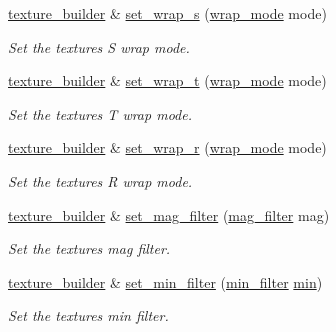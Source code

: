 \begin{DoxyCompactItemize}
\mbox{\hyperlink{classmoka_1_1texture__builder}{texture\+\_\+builder}} \& \mbox{\hyperlink{classmoka_1_1texture__builder_a555d3ea33ae09a175916eee13df9170c}{set\+\_\+wrap\+\_\+s}} (\mbox{\hyperlink{namespacemoka_afda3faa87bacaacc6008d8c1f73f6462}{wrap\+\_\+mode}} mode)
\begin{DoxyCompactList}\small\item\em Set the texture\textquotesingle{}s S wrap mode. \end{DoxyCompactList}\item 
\mbox{\hyperlink{classmoka_1_1texture__builder}{texture\+\_\+builder}} \& \mbox{\hyperlink{classmoka_1_1texture__builder_a450b409d8c9fac1a54c89130825a6c9f}{set\+\_\+wrap\+\_\+t}} (\mbox{\hyperlink{namespacemoka_afda3faa87bacaacc6008d8c1f73f6462}{wrap\+\_\+mode}} mode)
\begin{DoxyCompactList}\small\item\em Set the texture\textquotesingle{}s T wrap mode. \end{DoxyCompactList}\item 
\mbox{\hyperlink{classmoka_1_1texture__builder}{texture\+\_\+builder}} \& \mbox{\hyperlink{classmoka_1_1texture__builder_ab1113f82648d8e5555f53e0fd65ba294}{set\+\_\+wrap\+\_\+r}} (\mbox{\hyperlink{namespacemoka_afda3faa87bacaacc6008d8c1f73f6462}{wrap\+\_\+mode}} mode)
\begin{DoxyCompactList}\small\item\em Set the texture\textquotesingle{}s R wrap mode. \end{DoxyCompactList}\item 
\mbox{\hyperlink{classmoka_1_1texture__builder}{texture\+\_\+builder}} \& \mbox{\hyperlink{classmoka_1_1texture__builder_a08398bb398d3b35e1ecd7a669b3fd792}{set\+\_\+mag\+\_\+filter}} (\mbox{\hyperlink{namespacemoka_a2391e4ae99494b70d0226ee0e586f33c}{mag\+\_\+filter}} mag)
\begin{DoxyCompactList}\small\item\em Set the texture\textquotesingle{}s mag filter. \end{DoxyCompactList}\item 
\mbox{\hyperlink{classmoka_1_1texture__builder}{texture\+\_\+builder}} \& \mbox{\hyperlink{classmoka_1_1texture__builder_a308c57f97f3d9477f0b15e31ef37cf4c}{set\+\_\+min\+\_\+filter}} (\mbox{\hyperlink{namespacemoka_afeea6a53d61ee8561c91c62f5a051a77}{min\+\_\+filter}} \mbox{\hyperlink{namespacemoka_acf03408f89c521244763fb5f8746ce16ad8bd79cc131920d5de426f914d17405a}{min}})
\begin{DoxyCompactList}\small\item\em Set the texture\textquotesingle{}s min filter. \end{DoxyCompactList}\item 

\end{DoxyCompactItemize}
